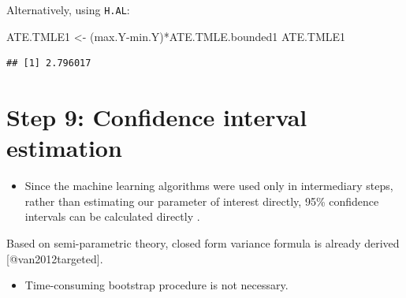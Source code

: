 \documentclass[
]{book}
\newenvironment{Shaded}{\begin{snugshade}}{\end{snugshade}}
\newcommand{\NormalTok}[1]{#1}
\newcommand{\OtherTok}[1]{\textcolor[rgb]{0.56,0.35,0.01}{#1}}
\newcommand{\SpecialCharTok}[1]{\textcolor[rgb]{0.00,0.00,0.00}{#1}}
\providecommand{\tightlist}{%
  \setlength{\itemsep}{0pt}\setlength{\parskip}{0pt}}
\begin{document}
Alternatively, using \texttt{H.AL}:

\begin{Shaded}
\begin{Highlighting}[]
\NormalTok{ATE.TMLE1 }\OtherTok{\textless{}{-}}\NormalTok{ (max.Y}\SpecialCharTok{{-}}\NormalTok{min.Y)}\SpecialCharTok{*}\NormalTok{ATE.TMLE.bounded1}
\NormalTok{ATE.TMLE1 }
\end{Highlighting}
\end{Shaded}

\begin{verbatim}
## [1] 2.796017
\end{verbatim}

\hypertarget{step-9-confidence-interval-estimation}{%
\section{Step 9: Confidence interval estimation}\label{step-9-confidence-interval-estimation}}

\begin{itemize}
\tightlist
\item
  Since the machine learning algorithms were used only in intermediary steps, rather than estimating our parameter of interest directly, 95\% confidence intervals can be calculated directly \citep{luque2018targeted}.
\end{itemize}

\begin{rmdcomment}
Based on semi-parametric theory, closed form variance formula is already
derived {[}@van2012targeted{]}.
\end{rmdcomment}

\begin{itemize}
\tightlist
\item
  Time-consuming bootstrap procedure is not necessary.
\end{itemize}
\end{document}
